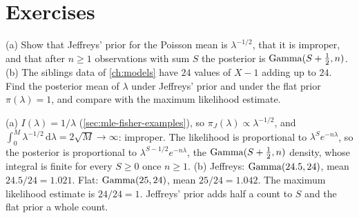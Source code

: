 \section{Exercises}
\label{sec:jeff-exercises}

\begin{exercise}
\label{ex:jeff-poisson}
(a) Show that Jeffreys' prior for the Poisson mean is $\lambda^{-1/2}$, that it is improper, and that after $n \geq 1$ observations with sum $S$ the posterior is $\mathrm{Gamma}(S + \frac12, n)$. (b) The siblings data of \cref{ch:models} have $24$ values of $X - 1$ adding up to $24$. Find the posterior mean of $\lambda$ under Jeffreys' prior and under the flat prior $\pi(\lambda) = 1$, and compare with the maximum likelihood estimate.
\end{exercise}
\begin{solution}
(a) $I(\lambda) = 1/\lambda$ (\cref{sec:mle-fisher-examples}), so $\pi_J(\lambda) \propto \lambda^{-1/2}$, and $\int_0^M \lambda^{-1/2}\,\mathrm{d}\lambda = 2\sqrt{M} \to \infty$: improper. The likelihood is proportional to $\lambda^{S}e^{-n\lambda}$, so the posterior is proportional to $\lambda^{S - 1/2}e^{-n\lambda}$, the $\mathrm{Gamma}(S + \frac12, n)$ density, whose integral is finite for every $S \geq 0$ once $n \geq 1$. (b) Jeffreys: $\mathrm{Gamma}(24.5, 24)$, mean $24.5/24 = 1.021$. Flat: $\mathrm{Gamma}(25, 24)$, mean $25/24 = 1.042$. The maximum likelihood estimate is $24/24 = 1$. Jeffreys' prior adds half a count to $S$ and the flat prior a whole count.
\end{solution}

